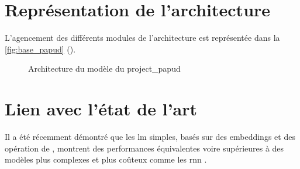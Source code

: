 
\section{Représentation de l'architecture}

L'agencement des différents modules de l'architecture est représentée dans la \autoref{fig:base_papud} ().

\begin{figure}[ht]
	\centering
	
	\caption[Architecture du modèle du projet PAPUD]{Architecture du modèle du \gls{project_papud}}
	\label{fig:base_papud}
\end{figure}

\section{Lien avec l'état de l'art}
Il a été récemment démontré que les \gls{lm} simples, basés sur des  \glspl{embedding} et des opération de ,
montrent des performances équivalentes voire supérieures à des modèles plus complexes et plus coûteux comme les \gls{rnn} \autocite{pooling_simple}.

%
%
%
%
%
